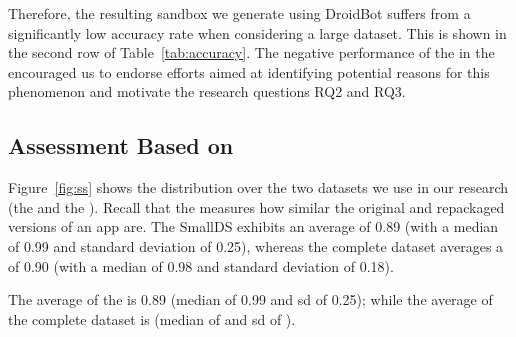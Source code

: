 



Therefore, the resulting sandbox we generate using
DroidBot suffers from a significantly low accuracy rate when considering a large dataset.
This is shown in the second row of Table~\ref{tab:accuracy}.
The negative performance of the \mas in the \cds encouraged us to endorse efforts aimed at identifying potential reasons for
this phenomenon and motivate the research questions RQ2 and RQ3.



\subsection{Assessment Based on \sscore}

Figure~\ref{fig:ss} shows the \sscore distribution
over the two datasets we use in our research
(the \sds and the \cds).
Recall that the \sscore measures how similar the
original and repackaged versions of an app are.
The SmallDS exhibits an average \sscore of 0.89 (with a median of 0.99 and standard deviation of 0.25),
whereas the complete dataset averages a \sscore of 0.90 (with a median of 0.98 and standard deviation of 0.18). 

The average \sscore of the
\sds is 0.89 (median of 0.99 and sd of 0.25); while
the average \sscore of the complete dataset is
 (median of  and sd of ).

